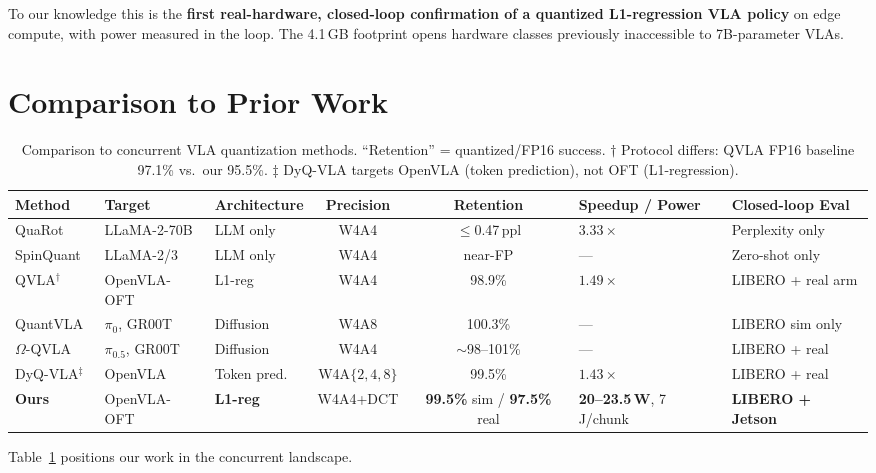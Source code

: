 \documentclass[conference]{IEEEtran}
\begin{document}
To our knowledge this is the \textbf{first real-hardware, closed-loop confirmation of a
quantized L1-regression VLA policy} on edge compute, with power measured in the loop. The
4.1\,GB footprint opens hardware classes previously inaccessible to 7B-parameter VLAs.

\section{Comparison to Prior Work}
\label{sec:comparison}

\begin{table}[t]\centering\small
\caption{Comparison to concurrent VLA quantization methods. ``Retention'' = quantized/FP16
success. $\dagger$ Protocol differs: QVLA FP16 baseline 97.1\% vs.\ our 95.5\%.
$\ddagger$ DyQ-VLA targets OpenVLA (token prediction), not OFT (L1-regression).}
\label{tab:comparison}
\begin{tabular}{p{1.9cm}p{2.3cm}p{1.6cm}ccp{2.2cm}p{2.0cm}}
\toprule
Method & Target & Architecture & Precision & Retention & Speedup / Power & Closed-loop Eval \\
\midrule
QuaRot~\cite{quarot} & LLaMA-2-70B & LLM only & W4A4 & $\leq$0.47\,ppl & $3.33\times$ & Perplexity only \\
SpinQuant~\cite{spinquant} & LLaMA-2/3 & LLM only & W4A4 & near-FP & --- & Zero-shot only \\
\midrule
QVLA$^\dagger$~\cite{qvla} & OpenVLA-OFT & L1-reg & W4A4 & 98.9\% & $1.49\times$ & LIBERO + real arm \\
QuantVLA~\cite{quantvla} & $\pi_0$, GR00T & Diffusion & W4A8 & 100.3\% & --- & LIBERO sim only \\
$\Omega$-QVLA~\cite{omegaqvla} & $\pi_{0.5}$, GR00T & Diffusion & W4A4 & $\sim$98--101\% & --- & LIBERO + real \\
DyQ-VLA$^\ddagger$~\cite{dyqvla} & OpenVLA & Token pred. & W4A$\{2,4,8\}$ & 99.5\% & $1.43\times$ & LIBERO + real \\
\midrule
\textbf{Ours} & OpenVLA-OFT & \textbf{L1-reg} & W4A4+DCT & \textbf{99.5\%} sim / \textbf{97.5\%} real & \textbf{20--23.5\,W}, 7\,J/chunk & \textbf{LIBERO + Jetson} \\
\bottomrule
\end{tabular}
\end{table}

Table~\ref{tab:comparison} positions our work in the concurrent landscape.
\end{document}
